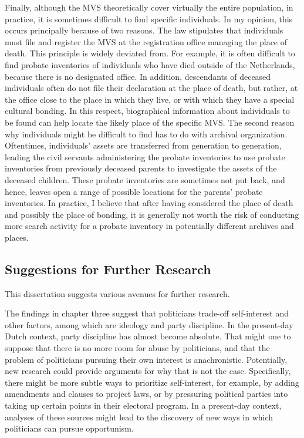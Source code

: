 Finally, although the MVS theoretically cover virtually the entire population, in practice, it is sometimes difficult to find specific individuals. In my opinion, this occurs principally because of two reasons. The law stipulates that individuals must file and register the MVS at the registration office managing the place of death. This principle is widely deviated from. For example, it is often difficult to find probate inventories of individuals who have died outside of the Netherlands, because there is no designated office. In addition, descendants of deceased individuals often do not file their declaration at the place of death, but rather, at the office close to the place in which they live, or with which they have a special cultural bonding. In this respect, biographical information about individuals to be found can help locate the likely place of the specific MVS. The second reason why individuals might be difficult to find has to do with archival organization. Oftentimes, individuals' assets are transferred from generation to generation, leading the civil servants administering the probate inventories to use probate inventories from previously deceased parents to investigate the assets of the deceased children. These probate inventories are sometimes not put back, and hence, leaves open a range of possible locations for the parents' probate inventories. In practice, I believe that after having considered the place of death and possibly the place of bonding, it is generally not worth the risk of conducting more search activity for a probate inventory in potentially different archives and places.  





\subsection{Suggestions for Further Research}\label{sec:sfr}

This dissertation suggests various avenues for further research. 

The findings in chapter three suggest that politicians trade-off self-interest and other factors, among which are ideology and party discipline. In the present-day Dutch context, party discipline has almost become absolute. That might one to suppose that there is no more room for abuse by politicians, and that the problem of politicians pursuing their own interest is anachronistic. Potentially, new research could provide arguments for why that is not the case. Specifically, there might be more subtle ways to prioritize self-interest, for example, by adding amendments and clauses to project laws, or by pressuring political parties into taking up certain points in their electoral program. In a present-day context, analyses of these sources might lead to the discovery of new ways in which politicians can pursue opportunism. 

